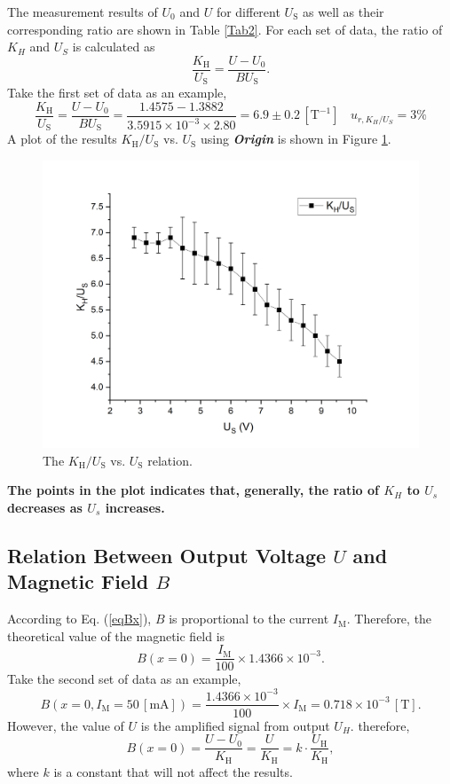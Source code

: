 \documentclass{article}
\begin{document}
The measurement results of $U_0$ and $U$ for different $U_\text{S}$ as well as their corresponding ratio are shown in Table \ref{Tab2}.  For each set of data, the ratio of $K_H$ and $U_S$ is calculated as
$$\displaystyle \frac{K_\text{H}}{U_\text{S}} = \frac{U-U_0}{BU_\text{S}}.$$
Take the first set of data as an example,
$$\frac{K_\text{H}}{U_\text{S}} = \frac{U-U_0}{BU_\text{S}} = \frac{1.4575-1.3882}{3.5915\times 10^{-3}\times2.80} =  6.9 \pm 0.2 \,[\text{T}^{-1}]~~~~u_{r,K_H/U_S} = 3\%$$
A plot of the results $K_\text{H}/U_\text{S}$ vs. $U_\text{S}$ using \textit{\textbf{Origin}} is shown in Figure \ref{FigKU}.

\begin{figure}[H]
\centering
\includegraphics[scale=0.5]{K-U.png}
\caption{The $K_\text{H}/U_\text{S}$ vs. $U_\text{S}$ relation.}\label{FigKU}
\end{figure}

\textbf{The points in the plot indicates that, generally,  the ratio of $K_{H}$ to $U_{s}$ decreases as $U_{s}$ increases.}

	\subsection{Relation Between Output Voltage $U$ and Magnetic Field $B$}\label{SecUB}
	
According to Eq. (\ref{eqBx}), $B$ is proportional to the current $I_\text{M}$. Therefore, the theoretical value of the magnetic field is $$B(x=0) = \frac{I_\text{M}}{100}\times 1.4366\times10^{-3}.$$
Take the second set of data as an example, 
$$B(x=0,I_\text{M}=50\,[\text{mA}]) = \frac{1.4366\times10^{-3}}{100}\times I_\text{M} = 0.718\times 10^{-3}\,[\text{T}].$$
However, the value of $U$ is the amplified signal from output $U_H$. therefore, 
$$B(x=0) = \frac{U-U_0}{K_\text{H}} = \frac{U}{K_\text{H}} = k\cdot\frac{U_\text{H}}{K_\text{H}},$$
where $k$ is a constant that will not affect the results.
\end{document}
